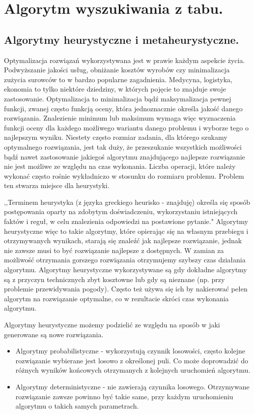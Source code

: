 \chapter{Algorytm wyszukiwania z tabu.}
\section{Algorytmy heurystyczne i metaheurystyczne.}
 Optymalizacja rozwiązań wykorzystywana jest w prawie każdym aspekcie życia. Podwyższanie jakości usług, obniżanie kosztów wyrobów czy minimalizacja zużycia surowców to w bardzo popularne zagadnienia. Medycyna, logistyka, ekonomia to tylko niektóre dziedziny, w których pojęcie to znajduje swoje zastosowanie. 
 Optymalizacja to minimalizacja bądź maksymalizacja pewnej funkcji, zwanej często funkcją oceny, która jednoznacznie określa jakość danego rozwiązania. Znalezienie minimum lub maksimum wymaga więc wyznaczenia funkcji oceny dla każdego możliwego wariantu danego problemu i wyborze tego o najlepszym wyniku. Niestety często rozmiar zadania, dla którego szukamy optymalnego rozwiązania, jest tak duży, że przeszukanie wszystkich możliwości bądź nawet zastosowanie jakiegoś algorytmu znajdującego najlepsze rozwiązanie nie jest możliwe ze względu na czas wykonania. Liczba operacji, które należy wykonać często rośnie wykładniczo w stosunku do rozmiaru problemu. Problem ten stwarza miejsce dla heurystyki.
 
 ,,Terminem heurystyka (z języka greckiego heurisko - znajduję) określa się sposób postępowania oparty na zdobytym doświadczeniu, wykorzystaniu istniejących faktów i reguł, w celu znalezienia odpowiedzi na postawione pytanie."\cite{Algorytmy:Widuch} Algorytmy heurystyczne więc to takie algorytmy, które opierając się na własnym przebiegu i otrzymywanych wynikach, starają się znaleźć jak najlepsze rozwiązanie, jednak nie zawsze musi to być rozwiązanie najlepsze z dostępnych. W zamian za możliwość otrzymania gorszego rozwiązania otrzymujemy szybszy czas działania algorytmu. Algorytmy heurystyczne wykorzystywane są gdy dokładne algorytmy są z przyczyn technicznych zbyt kosztowne lub gdy są nieznane (np. przy problemie przewidywania pogody). Często też używa się ich by nakierować pełen algorytm na rozwiązanie optymalne, co w rezultacie skróci czas wykonania algorytmu.
 
 Algorytmy heurystyczne możemy podzielić ze względu na sposób w jaki generowane są nowe rozwiązania.
 \begin{itemize}
 	\item Algorytmy probabilistyczne - wykorzystują czynnik losowości, często kolejne rozwiązanie wybierane jest losowo z określonej puli. Co może doprowadzić do różnych wyników końcowych otrzymanych z kolejnych uruchomień algorytmu.
 	\item Algorytmy deterministyczne - nie zawierają czynnika losowego. Otrzymywane rozwiązanie zawsze powinno być takie same, przy każdym uruchomieniu algorytmu o takich samych parametrach. 	
 \end{itemize}

